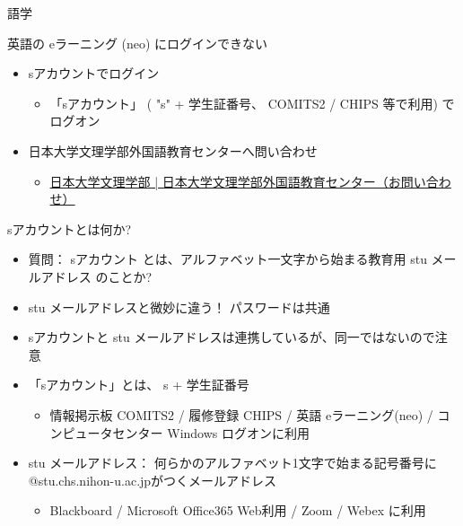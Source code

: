 \documentclass[a4j,10pt]{jsarticle}
\begin{document}
{\newpage\clearpage
{}%
\begin{frame}[label={sec:org4d469f0},fragile]{語学}
\begin{block}{英語の eラーニング (neo) にログインできない}
\begin{itemize}
\item sアカウントでログイン
\begin{itemize}
\item 「sアカウント」 ( "s" + 学生証番号、 COMITS2 / CHIPS 等で利用) でログオン
\end{itemize}
\par
\item 日本大学文理学部外国語教育センターへ問い合わせ
\begin{itemize}
\item \href{https://www.chs.nihon-u.ac.jp/contact/flec\_form/}{日本大学文理学部 | 日本大学文理学部外国語教育センター（お問い合わせ）}
\end{itemize}
\end{itemize}
\end{block}
\par
\begin{block}{sアカウントとは何か?}
\begin{itemize}
\item 質問： \alert{sアカウント} とは、アルファベット一文字から始まる教育用 \alert{stu メールアドレス} のことか?
\par
\item stu メールアドレスと微妙に違う！ パスワードは共通
\item sアカウントと stu メールアドレスは連携しているが、同一ではないので注意
\par
\item 「sアカウント」とは、 \alert{s} + \alert{学生証番号}
\begin{itemize}
\item 情報掲示板 COMITS2 / 履修登録 CHIPS / 英語 eラーニング(neo) / コンピュータセンター Windows ログオンに利用
\end{itemize}
\par
\item stu メールアドレス： 何らかのアルファベット1文字で始まる記号番号に@stu.chs.nihon-u.ac.jpがつくメールアドレス
\begin{itemize}
\item Blackboard / Microsoft Office365 Web利用 / Zoom / Webex に利用
\end{itemize}
\end{itemize}
\end{block}

\end{frame}}
\end{document}
